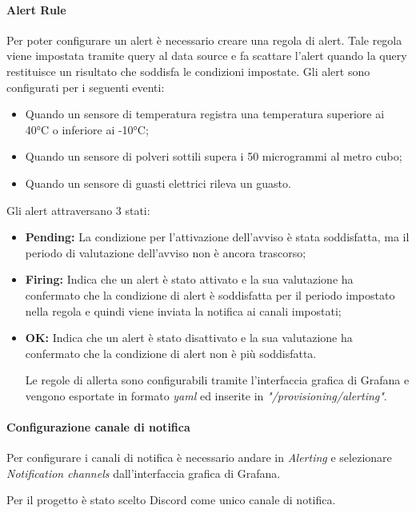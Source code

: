 \paragraph{Alert Rule}
Per poter configurare un alert è necessario creare una regola di alert. Tale regola viene impostata tramite query al data source e fa scattare l'alert quando la query restituisce un risultato che soddisfa le condizioni impostate.
Gli alert sono configurati per i seguenti eventi:
\begin{itemize}
    \item Quando un sensore di temperatura registra una temperatura superiore ai 40°C o inferiore ai -10°C;
    \item Quando un sensore di polveri sottili supera i 50 microgrammi al metro cubo;
    \item Quando un sensore di guasti elettrici rileva un guasto.
\end{itemize}

Gli alert attraversano 3 stati:
\begin{itemize}
    \item \textbf{Pending:} La condizione per l'attivazione dell'avviso è stata soddisfatta, ma il periodo di valutazione dell'avviso non è ancora trascorso;
    \item \textbf{Firing:} Indica che un alert è stato attivato e la sua valutazione ha confermato che la condizione di alert è soddisfatta per il periodo impostato nella regola e quindi viene inviata la notifica ai canali impostati;
    \item \textbf{OK:} Indica che un alert è stato disattivato e la sua valutazione ha confermato che la condizione di alert non è più soddisfatta.

Le regole di allerta sono configurabili tramite l'interfaccia grafica di Grafana e vengono esportate in formato \textit{yaml} ed inserite in \textit{"/provisioning/alerting"}.
                            
\end{itemize}

\paragraph{Configurazione canale di notifica}
Per configurare i canali di notifica è necessario andare in \textit{Alerting} e selezionare \textit{Notification channels} dall'interfaccia grafica di Grafana.

Per il progetto è stato scelto Discord come unico canale di notifica.

